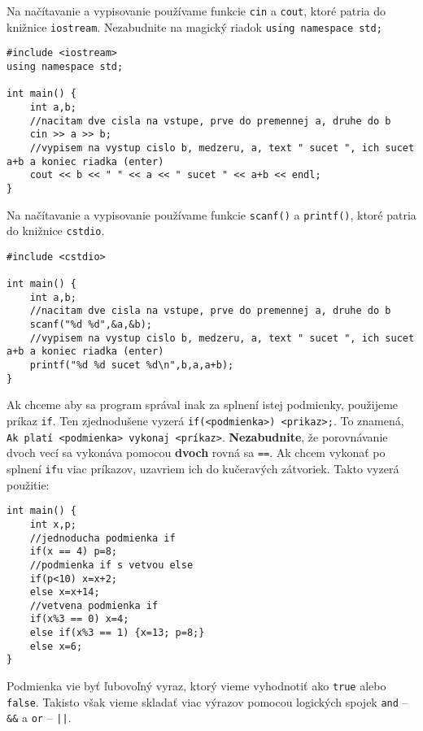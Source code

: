 
Na načítavanie a vypisovanie používame funkcie \texttt{cin} a \texttt{cout}, ktoré patria do
knižnice \texttt{iostream}. Nezabudnite na magický riadok \texttt{using namespace std;}

\begin{lstlisting}
#include <iostream>
using namespace std;

int main() {
    int a,b;
    //nacitam dve cisla na vstupe, prve do premennej a, druhe do b
    cin >> a >> b;
    //vypisem na vystup cislo b, medzeru, a, text " sucet ", ich sucet a+b a koniec riadka (enter)
    cout << b << " " << a << " sucet " << a+b << endl;
}
\end{lstlisting}


Na načítavanie a vypisovanie používame funkcie \texttt{scanf()} a \texttt{printf()}, ktoré patria do
knižnice \texttt{cstdio}.

\begin{lstlisting}
#include <cstdio>

int main() {
    int a,b;
    //nacitam dve cisla na vstupe, prve do premennej a, druhe do b
    scanf("%d %d",&a,&b);
    //vypisem na vystup cislo b, medzeru, a, text " sucet ", ich sucet a+b a koniec riadka (enter)
    printf("%d %d sucet %d\n",b,a,a+b);
}
\end{lstlisting}


Ak chceme aby sa program správal inak za splnení istej podmienky, použijeme príkaz \texttt{if}. Ten
zjednodušene vyzerá \texttt{if(<podmienka>) <prikaz>;}. To znamená, \texttt{Ak platí <podmienka>
vykonaj <príkaz>}. \textbf{Nezabudnite}, že porovnávanie dvoch vecí sa vykonáva pomocou \textbf{dvoch}
rovná sa \texttt{==}. Ak chcem vykonať po splnení \texttt{if}u viac príkazov, uzavriem ich do
kučeravých zátvoriek. Takto vyzerá použitie:

\begin{lstlisting}
int main() {
    int x,p;
    //jednoducha podmienka if
    if(x == 4) p=8;
    //podmienka if s vetvou else
    if(p<10) x=x+2;
    else x=x+14;
    //vetvena podmienka if
    if(x%3 == 0) x=4;
    else if(x%3 == 1) {x=13; p=8;}
    else x=6;
}
\end{lstlisting}

Podmienka vie byť ľubovoľný vyraz, ktorý vieme vyhodnotiť ako \texttt{true} alebo \texttt{false}.
Takisto však vieme skladať viac výrazov pomocou logických spojek \texttt{and} -- \texttt{\&\&} a
\texttt{or} -- \texttt{||}.

